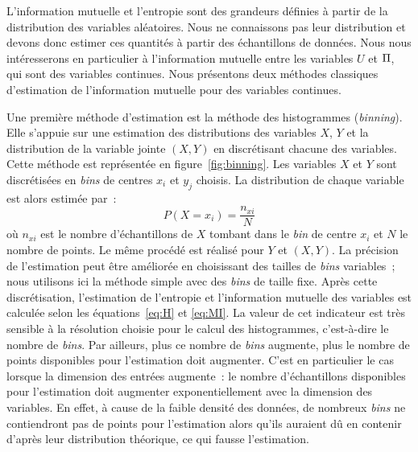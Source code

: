 \documentclass[../main]{subfiles}
\begin{document}
L'information mutuelle et l'entropie sont des grandeurs définies à partir de la distribution des variables aléatoires. Nous ne connaissons pas leur distribution et devons donc estimer ces quantités à partir des échantillons de données. 
Nous nous intéresserons en particulier à l'information mutuelle entre les variables $U$ et $\Pi$, qui sont des variables continues. Nous présentons deux méthodes classiques d'estimation de l'information mutuelle pour des variables continues.


Une première méthode d'estimation est la méthode des histogrammes (\emph{binning}).
Elle s'appuie sur une estimation des distributions des variables $X$, $Y$ et la distribution de la variable jointe $(X,Y)$ en discrétisant chacune des variables.
Cette méthode est représentée en figure~\ref{fig:binning}. Les variables $X$ et $Y$ sont discrétisées en \emph{bins} de centres $x_i$ et $y_j$ choisis.
La distribution de chaque variable est alors estimée par~: 
$$P(X = x_i) = \frac{n_{xi}}{N} $$ où $n_{xi}$ est le nombre d'échantillons de $X$ tombant dans le \emph{bin} de centre $x_i$ et $N$ le nombre de points. Le même procédé est réalisé pour $Y$ et $(X,Y)$. La précision de l'estimation peut être améliorée en choisissant des tailles de \emph{bins} variables~; nous utilisons ici la méthode simple avec des \emph{bins} de taille fixe.
Après cette discrétisation, l'estimation de l'entropie et l'information mutuelle des variables est calculée selon les équations~\ref{eq:H} et \ref{eq:MI}.
La valeur de cet indicateur est très sensible à la résolution choisie pour le calcul des histogrammes, c'est-à-dire le nombre de \emph{bins}.
Par ailleurs, plus ce nombre de \emph{bins} augmente, plus le nombre de points disponibles pour l'estimation doit augmenter. C'est en particulier le cas lorsque la dimension des entrées augmente~:
le nombre d'échantillons disponibles pour l'estimation doit augmenter exponentiellement avec la dimension des variables. En effet, à cause de la faible densité des données, de nombreux \emph{bins} ne contiendront pas de points pour l'estimation alors qu'ils auraient dû en contenir d'après leur distribution théorique, ce qui fausse l'estimation.
\end{document}
